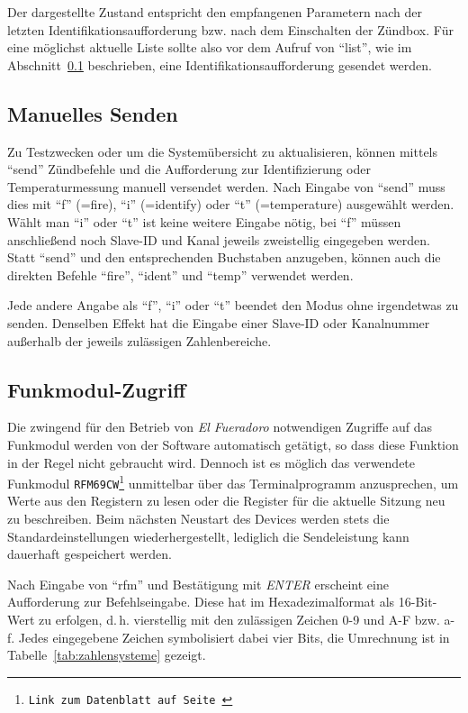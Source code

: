 \documentclass[pdftex, parskip, numbers=noenddot, toc=listof]{scrbook}
\newcommand{\anlage}{\emph{El Fueradoro}}
\begin{document}
	Der dargestellte Zustand entspricht den empfangenen Parametern nach der letzten Identifikationsaufforderung bzw. nach dem Einschalten der Zündbox. Für eine möglichst aktuelle Liste sollte also vor dem Aufruf von \enquote{list}, wie im Abschnitt~\ref{sec:manuellessenden} beschrieben, eine Identifikationsaufforderung gesendet werden.


	\subsection{Manuelles Senden}
	\label{sec:manuellessenden}

	Zu Testzwecken oder um die Systemübersicht zu aktualisieren, können mittels \enquote{send} Zündbefehle und die Aufforderung zur Identifizierung oder Temperaturmessung manuell versendet werden. Nach Eingabe von \enquote{send} muss dies mit \enquote{f} (=fire), \enquote{i} (=identify) oder \enquote{t} (=temperature) ausgewählt werden. Wählt man \enquote{i} oder \enquote{t} ist keine weitere Eingabe nötig, bei \enquote{f} müssen anschließend noch Slave-ID und Kanal jeweils zweistellig eingegeben werden. Statt \enquote{send} und den entsprechenden Buchstaben anzugeben, können auch die direkten Befehle \mbox{\enquote{fire}}, \mbox{\enquote{ident}} und \mbox{\enquote{temp}} verwendet werden.

	Jede andere Angabe als \enquote{f}, \enquote{i} oder \enquote{t} beendet den Modus ohne irgendetwas zu senden. Denselben Effekt hat die Eingabe einer Slave-ID oder Kanalnummer außerhalb der jeweils zulässigen Zahlenbereiche.


	\subsection{Funkmodul-Zugriff}
	\label{sec:rfmzugriff}

	Die zwingend für den Betrieb von {\anlage} notwendigen Zugriffe auf das Funkmodul werden von der Software automatisch getätigt, so dass diese Funktion in der Regel nicht gebraucht wird. Dennoch ist es möglich das verwendete Funkmodul \texttt{RFM69CW\footnote{Link zum Datenblatt auf Seite~\pageref{sec:datasheets}}} unmittelbar über das Terminalprogramm anzusprechen, um Werte aus den Registern zu lesen oder die Register für die aktuelle Sitzung neu zu beschreiben. Beim nächsten Neustart des Devices werden stets die Standardeinstellungen wiederhergestellt, lediglich die Sendeleistung kann dauerhaft gespeichert werden.

	Nach Eingabe von \enquote{rfm} und Bestätigung mit \emph{ENTER} erscheint eine Aufforderung zur Befehls\-eingabe. Diese hat im Hexadezimalformat als 16-Bit-Wert zu erfolgen, d.\,h. vierstellig mit den zulässigen Zeichen 0-9 und A-F bzw. a-f. Jedes eingegebene Zeichen symbolisiert dabei vier Bits, die Umrechnung ist in Tabelle~\ref{tab:zahlensysteme} gezeigt.
\end{document}
